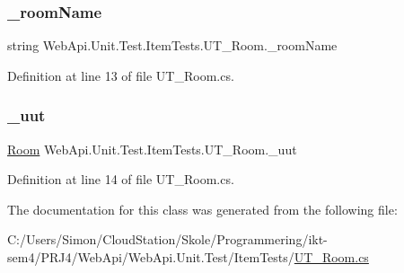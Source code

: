 \subsubsection{\texorpdfstring{\+\_\+room\+Name}{\_roomName}}
{\footnotesize\ttfamily string Web\+Api.\+Unit.\+Test.\+Item\+Tests.\+U\+T\+\_\+\+Room.\+\_\+room\+Name\hspace{0.3cm}{\ttfamily [private]}}



Definition at line 13 of file U\+T\+\_\+\+Room.\+cs.

\mbox{\label{class_web_api_1_1_unit_1_1_test_1_1_item_tests_1_1_u_t___room_a025e55bd7f700e0e81ae1d9dc631af42}} 
\subsubsection{\texorpdfstring{\+\_\+uut}{\_uut}}
{\footnotesize\ttfamily \mbox{\hyperlink{class_f_w_p_s_1_1_models_1_1_room}{Room}} Web\+Api.\+Unit.\+Test.\+Item\+Tests.\+U\+T\+\_\+\+Room.\+\_\+uut\hspace{0.3cm}{\ttfamily [private]}}



Definition at line 14 of file U\+T\+\_\+\+Room.\+cs.



The documentation for this class was generated from the following file\+:\begin{DoxyCompactItemize}
\item 
C\+:/\+Users/\+Simon/\+Cloud\+Station/\+Skole/\+Programmering/ikt-\/sem4/\+P\+R\+J4/\+Web\+Api/\+Web\+Api.\+Unit.\+Test/\+Item\+Tests/\mbox{\hyperlink{_u_t___room_8cs}{U\+T\+\_\+\+Room.\+cs}}\end{DoxyCompactItemize}
